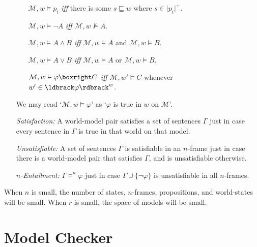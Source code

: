 \documentclass[a4paper, 11pt]{article} %
\newcommand{\set}[1]{\lbrace#1\rbrace} %
\newcommand{\M}[0]{\mathcal{M}}
\renewcommand{\Vert}[1]{\ldbrack#1\rdbrack}
\renewcommand{\vert}[1]{\lvert#1\rvert}
\begin{document}
\begin{enumerate}
    \begin{itemize}
      \item[] $\M, w \vDash p_i$ \textit{iff} there is some $s \sqsubseteq w$ where $s \in \vert{p_i}^+$.
      \item[] $\M, w \vDash \neg A$ \textit{iff} $\M, w \nvDash A$.
      \item[] $\M, w \vDash A \wedge B$ \textit{iff} $\M, w \vDash A$ and $\M, w \vDash B$.
      \item[] $\M, w \vDash A \vee B$ \textit{iff} $\M, w \vDash A$ or $\M, w \vDash B$.
      \item[] $\M, w \vDash \varphi\boxright C$ \textit{iff} $\M, w' \vDash C$ whenever $w'\in\Vert{\varphi}^w$.
    \end{itemize}
    We may read `$\M, w \vDash \varphi$' as `$\varphi$ is true in $w$ on $\M$'.
  \item[\it Satisfaction:] A world-model pair satisfies a set of sentences $\Gamma$ just in case every sentence in $\Gamma$ is true in that world on that model.
  \item[\it Unsatisfiable:] A set of sentences $\Gamma$ is satisfiable in an $n$-frame just in case there is a world-model pair that satisfies $\Gamma$, and is unsatisfiable otherwise.
  \item[\it $n$-Entailment:] $\Gamma \vDash^n \varphi$ just in case $\Gamma\cup\set{\neg\varphi}$ is unsatisfiable in all $n$-frames. 
\end{enumerate}

\noindent
When $n$ is small, the number of states, $n$-frames, propositions, and world-states will be small.
When $r$ is small, the space of models will be small.




\section{Model Checker}
\end{document}
